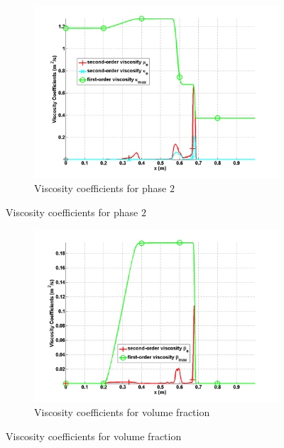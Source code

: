 \documentclass{anstrans}
\begin{document}
\begin{figure}[H]
        \begin{subfigure}[b]{0.495\textwidth}
                \centering
                \includegraphics[width=\textwidth]{plots/relaxation_two_phases_vapor_viscosity_kappa_mu.png}
                \caption{Viscosity coefficients for phase $2$}
                \label{fig:viscosity_coeff_vap}
        \end{subfigure}        
\end{figure}
\begin{figure}[H]				
        \begin{subfigure}[b]{0.495\textwidth}
                \centering
                \includegraphics[width=\textwidth]{plots/relaxation_two_phases_liquid_beta.png}
                \caption{Viscosity coefficients for volume fraction}
                \label{fig:viscosity_coeff_beta}
        \end{subfigure}        
\end{figure}
%
\end{document}
